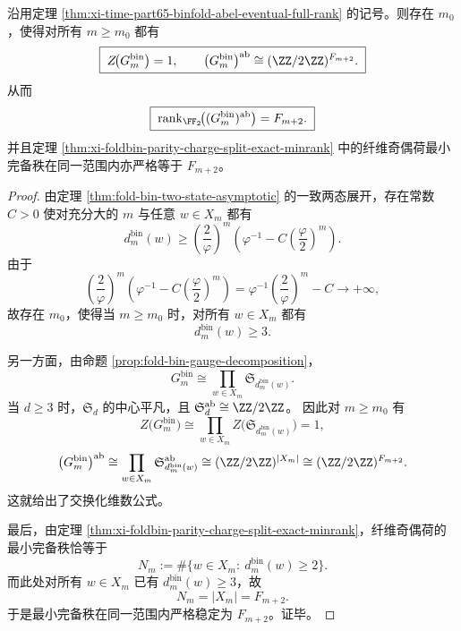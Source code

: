 \begin{theorem}\label{thm:xi-time-part65-binfold-center-vanishing-signature-stability}
沿用定理 \ref{thm:xi-time-part65-binfold-abel-eventual-full-rank} 的记号。则存在 \(m_0\)，使得对所有 \(m\ge m_0\) 都有
\[
\boxed{\;
Z\!\bigl(G_m^{\mathrm{bin}}\bigr)=1,
\qquad
\bigl(G_m^{\mathrm{bin}}\bigr)^{\mathrm{ab}}
\cong
(\ZZ/2\ZZ)^{F_{m+2}}.\;}
\]
从而
\[
\boxed{\;
\operatorname{rank}_{\FF_2}\!\bigl((G_m^{\mathrm{bin}})^{\mathrm{ab}}\bigr)=F_{m+2}.\;}
\]
并且定理 \ref{thm:xi-foldbin-parity-charge-split-exact-minrank} 中的纤维奇偶荷最小完备秩在同一范围内亦严格等于 \(F_{m+2}\)。
\end{theorem}
\begin{proof}
由定理 \ref{thm:fold-bin-two-state-asymptotic} 的一致两态展开，存在常数 \(C>0\) 使对充分大的 \(m\) 与任意 \(w\in X_m\) 都有
\[
d_m^{\mathrm{bin}}(w)
\ge
\left(\frac{2}{\varphi}\right)^m
\left(\varphi^{-1}-C\left(\frac{\varphi}{2}\right)^m\right).
\]
由于
\[
\left(\frac{2}{\varphi}\right)^m
\left(\varphi^{-1}-C\left(\frac{\varphi}{2}\right)^m\right)
=
\varphi^{-1}\left(\frac{2}{\varphi}\right)^m-C
\longrightarrow +\infty,
\]
故存在 \(m_0\)，使得当 \(m\ge m_0\) 时，对所有 \(w\in X_m\) 都有
\[
d_m^{\mathrm{bin}}(w)\ge 3.
\]

另一方面，由命题 \ref{prop:fold-bin-gauge-decomposition}，
\[
G_m^{\mathrm{bin}}
\cong
\prod_{w\in X_m}\mathfrak S_{d_m^{\mathrm{bin}}(w)}.
\]
当 \(d\ge 3\) 时，\(\mathfrak S_d\) 的中心平凡，且
\(
\mathfrak S_d^{\mathrm{ab}}\cong \ZZ/2\ZZ
\)。
因此对 \(m\ge m_0\) 有
\[
Z\!\bigl(G_m^{\mathrm{bin}}\bigr)
\cong
\prod_{w\in X_m} Z\!\bigl(\mathfrak S_{d_m^{\mathrm{bin}}(w)}\bigr)
=
1,
\]
\[
\bigl(G_m^{\mathrm{bin}}\bigr)^{\mathrm{ab}}
\cong
\prod_{w\in X_m}\mathfrak S_{d_m^{\mathrm{bin}}(w)}^{\mathrm{ab}}
\cong
(\ZZ/2\ZZ)^{|X_m|}
\cong
(\ZZ/2\ZZ)^{F_{m+2}}.
\]
这就给出了交换化维数公式。

最后，由定理 \ref{thm:xi-foldbin-parity-charge-split-exact-minrank}，纤维奇偶荷的最小完备秩恰等于
\[
N_m:=\#\{w\in X_m:\ d_m^{\mathrm{bin}}(w)\ge 2\}.
\]
而此处对所有 \(w\in X_m\) 已有 \(d_m^{\mathrm{bin}}(w)\ge 3\)，故
\[
N_m=|X_m|=F_{m+2}.
\]
于是最小完备秩在同一范围内严格稳定为 \(F_{m+2}\)。证毕。
\end{proof}

